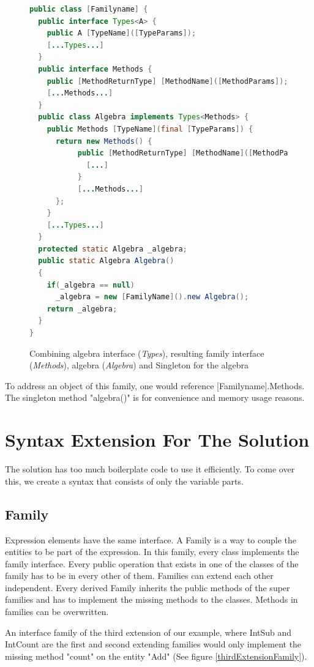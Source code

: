 \documentclass{report}
\begin{document}
\begin{figure}[t]
\begin{lstlisting}[language=java]
public class [Familyname] {
  public interface Types<A> {
    public A [TypeName]([TypeParams]);
    [...Types...]
  }
  public interface Methods { 
    public [MethodReturnType] [MethodName]([MethodParams]);
    [...Methods...]
  }
  public class Algebra implements Types<Methods> { 
    public Methods [TypeName](final [TypeParams]) {
      return new Methods() {
           public [MethodReturnType] [MethodName]([MethodParams]) { 
             [...]
           }
           [...Methods...]
      };
    }
    [...Types...]
  }
  protected static Algebra _algebra;
  public static Algebra Algebra()
  { 
    if(_algebra == null)
      _algebra = new [FamilyName]().new Algebra();
    return _algebra;
  }
}
\end{lstlisting}
\caption{Combining algebra interface (\emph{Types}), resulting family interface (\emph{Methods}), algebra (\emph{Algebra}) and Singleton for the algebra}
\label{combinedClass}
\end{figure}

To address an object of this family, one would reference [Familyname].Methods. The singleton method "algebra()" is for convenience and memory usage reasons.

\chapter{Syntax Extension For The Solution}
\label{syntaxExtensionEP}
The solution has too much boilerplate code to use it efficiently. To come over this, we create a syntax that consists of only the variable parts.

\section{Family}

Expression elements have the same interface. A Family is a way to couple the entities to be part of the expression. In this family, every class implements the family interface. Every public operation that exists in one of the classes of the family has to be in every other of them. Families can extend each other independent. Every derived Family inherits the public methods of the super families and has to implement the missing methods to the classes. Methods in families can be overwritten.

An interface family of the third extension of our example, where IntSub and IntCount are the first and second extending families would only implement the missing method "count" on the entity "Add" (See figure \ref{thirdExtensionFamily}).
\end{document}
